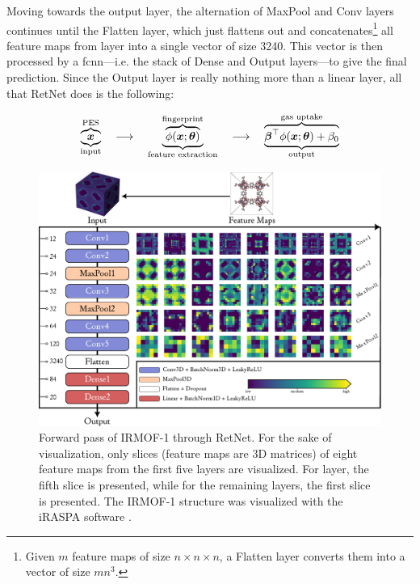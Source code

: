 Moving towards the output layer, the alternation of MaxPool and Conv layers
continues until the Flatten layer, which just flattens out
and concatenates\footnote{Given $m$ feature maps of size $n \times n \times n$,
a Flatten layer converts them into a vector of size $mn^3$.} all feature maps
from  layer into a single vector of size \num{3240}. This vector is then
processed by a \gls{fcnn}---i.e. the stack of Dense and
Output layers---to give the final prediction. Since the Output
layer is really nothing more than a linear
layer, all that RetNet does is the following:

\begin{equation}
	\label{eq:retnet}
	\underbrace{\overbrace{\boldsymbol{x}}^\text{PES}}_\text{input}
	\quad \longrightarrow \quad
	\underbrace{
		\overbrace{\phi(\boldsymbol{x};\boldsymbol{\theta})}
		^\text{fingerprint}
	}_\text{feature extraction}
	\quad \longrightarrow \quad
	\underbrace{
		\overbrace{\boldsymbol{\beta}^\top\phi(\boldsymbol{x};\boldsymbol{\theta}) + \beta_0}
		^\text{gas uptake}
	}_\text{output}
\end{equation}

\begin{figure}
	\centering
	\includegraphics[width=\textwidth]{fig/forward_pass.pdf}
	\caption[RetNet architecture.]{Forward pass of
	IRMOF-1 through RetNet. For the sake of
	visualization, only slices (feature maps are 3D matrices)
	of eight feature maps from the first five layers are visualized. For
	 layer, the fifth slice is presented, while for the remaining
	layers, the first slice is presented. The IRMOF-1 structure was visualized
	with the iRASPA software \parencite{Dubbeldam2018}.}
	\label{fig:retnet}
\end{figure}

